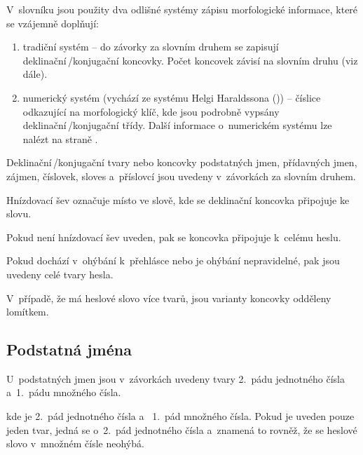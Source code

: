 V~slovníku jsou použity dva odlišné systémy zápisu morfologické informace, které se vzájemně doplňují:

\begin{enumerate}
\item tradiční systém -- do závorky za slovním druhem se zapisují deklinační\,/\addthin konjugační koncovky. Počet koncovek závisí na slovním druhu (viz dále).
\item numerický systém (vychází ze systému Helgi Haraldssona (\cite {is6})) -- číslice odkazující na morfologický klíč, kde jsou podrobně vypsány deklinační\,/\addthin konjugační třídy.
Další informace o~numerickém systému lze nalézt na straně \pageref{sec:dec}.
\end{enumerate}

Deklinační\,/\addthin konjugační tvary nebo koncovky podstatných jmen, přídavných jmen, zájmen, číslovek, sloves a~příslovcí jsou uvedeny v~závorkách za slovním druhem.

Hnízdovací šev \uv{\textbf{|}} označuje místo ve slově, kde se deklinační koncovka připojuje ke slovu.

\blspace
  \dicEntry {}  
\blspace

Pokud není hnízdovací šev \uv{\textbf{|}} uveden, pak se koncovka připojuje k~celému heslu.

\blspace
  \dicEntry {}  
\blspace

Pokud dochází v~ohýbání k~přehlásce nebo je ohýbání nepravidelné, pak jsou uvedeny celé tvary hesla.

\blspace
  \dicEntry {}  
\blspace

V~případě, že má heslové slovo více tvarů, jsou varianty koncovky odděleny lomítkem.

\blspace
  \dicEntry {}  
\blspace

\subsection*{Podstatná jména}

U~podstatných jmen jsou v~závorkách uvedeny tvary 2.~pádu jednotného čísla a~1.~pádu množného čísla.

\blspace
  \dicEntry {}  
\blspace

kde  je 2.~pád jednotného čísla a~ 1.~pád množného čísla.
Pokud je uveden pouze jeden tvar, jedná se o~2.~pád jednotného čísla a~znamená to rovněž, že se heslové slovo v~množném čísle neohýbá.

